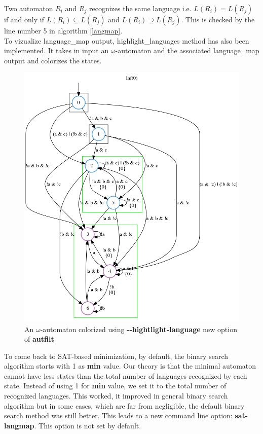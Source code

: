 Two automaton $R_i$ and $R_j$ recognizes the same language i.e.
$\textit{L}(R_i) = \textit{L}(R_j)$ if and only if
$\textit{L}(R_i) \subseteq \textit{L}(R_j)$ and $\textit{L}(R_i) \supseteq \textit{L}(R_j)$. This
is checked by the line number 5 in algorithm \ref{langmap}.\\

To vizualize language\_map output, highlight\_languages method has also been implemented. It takes in input
an $\omega$-automaton and the associated language\_map output and colorizes the states.\\

\begin{figure}[h]
 \centering
 \includegraphics[scale=0.6]{img/highlight_language.png}
 \caption{An $\omega$-automaton colorized using \textbf{-{}-hightlight-language} new option of
          \textbf{autfilt}}
 \label{fig:highlight_language}
\end{figure}

To come back to SAT-based minimization, by default, the binary search algorithm starts with 1 as
\textbf{min} value. Our theory is that the minimal automaton cannot have less states than the total number
of languages recognized by each state. Instead of using 1 for \textbf{min} value, we set it to the total
number of recognized languages. This worked, it improved in general binary search algorithm but in some
cases, which are far from negligible, the default binary search method was still better. This leads to a
new command line option: \textbf{sat-langmap}. This option is not set by default.
